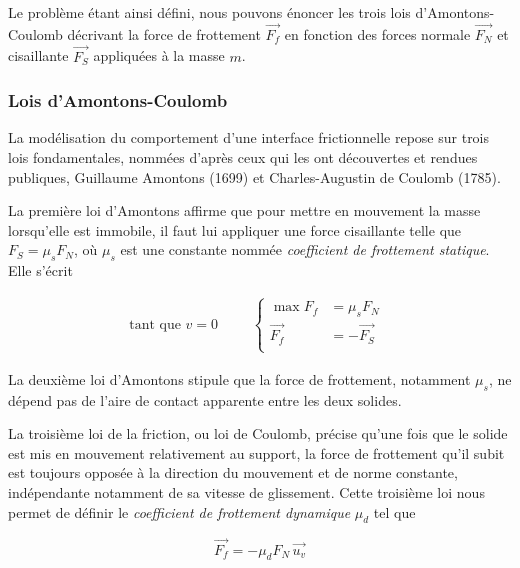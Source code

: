 Le problème étant ainsi défini, nous pouvons énoncer les trois lois d'Amontons-Coulomb décrivant la force de frottement $\vec{F_f}$ en fonction des forces normale $\vec{F_N}$ et cisaillante $\vec{F_S}$ appliquées à la masse $m$.


\subsubsection{Lois d'Amontons-Coulomb}

La modélisation du comportement d'une interface frictionnelle repose sur trois lois fondamentales, nommées d'après ceux qui les ont découvertes et rendues publiques, Guillaume Amontons (1699) et Charles-Augustin de Coulomb (1785).


La première loi d'Amontons affirme que pour mettre en mouvement la masse lorsqu'elle est immobile, il faut lui appliquer une force cisaillante telle que $F_S=\mu_sF_N$, où $\mu_s$ est une constante nommée \textit{coefficient de frottement statique}. Elle s'écrit

\begin{equation}
\text{tant que }{v}=0\qquad
\begin{aligned}\left\{
	\begin{split}
		\max F_f &= \mu_s F_N\\
		\vec{F_f} &= -\vec{F_S}\\
	\end{split}
	\right.
\end{aligned}
\end{equation}


La deuxième loi d'Amontons stipule que la force de frottement, notamment $\mu_s$, ne dépend pas de l'aire de contact apparente entre les deux solides.




La troisième loi de la friction, ou loi de Coulomb, précise qu'une fois que le solide est mis en mouvement relativement au support, la force de frottement qu'il subit est toujours opposée à la direction du mouvement et de norme constante, indépendante notamment de sa vitesse de glissement. Cette troisième loi nous permet de définir le \textit{coefficient de frottement dynamique} $\mu_d$ tel que

\begin{equation}
\vec{F_f} = - \mu_d F_N\,\vec{u_v}
\end{equation}


